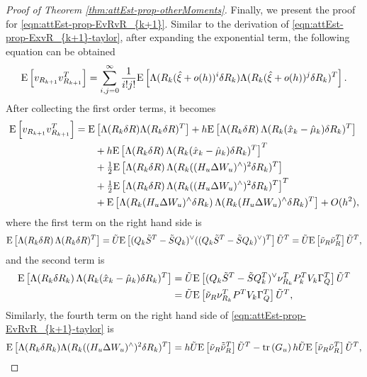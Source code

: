 \begin{proof}[Proof of Theorem \ref{thm:attEst-prop-otherMoments}]
	Finally, we present the proof for \eqref{eqn:attEst-prop-EvRvR_{k+1}}.
	Similar to the derivation of \eqref{eqn:attEst-prop-ExvR_{k+1}-taylor}, after expanding the exponential term, the following equation can be obtained
	\begin{align*}   
		\mathrm{E}\left[ v_{R_{k+1}}v^T_{R_{k+1}} \right] = \sum_{i,j=0}^\infty \frac{1}{i! j!} \mathrm{E}\left[ \Lambda( R_k(\hat{\xi}+o(h))^i \delta R_k) \Lambda( R_k(\hat{\xi}+o(h))^j \delta R_k)^T \right].
	\end{align*}
	After collecting the first order terms, it becomes
	\begin{align} \label{eqn:attEst-prop-EvRvR_{k+1}-taylor}
		\expect{v_{R_{k+1}}v^T_{R_{k+1}}} &= \expect{ \Lambda( R_k\delta R )\Lambda( R_k\delta R )^T } + h\expect{\Lambda( R_k\delta R )\, \Lambda( R_k(\hat{x}_k-\hat{\mu}_k)\delta R_k )^T} \nonumber \\
		&\qquad + h\expect{\Lambda( R_k\delta R )\, \Lambda( R_k(\hat{x}_k-\hat{\mu}_k)\delta R_k )^T}^T \nonumber \\
		&\qquad + \tfrac{1}{2}\expect{\Lambda( R_k\delta R )\, \Lambda( R_k((H_u\Delta W_u)^\wedge)^2\delta R_k )^T} \nonumber \\
		&\qquad + \tfrac{1}{2}\expect{\Lambda( R_k\delta R )\, \Lambda( R_k((H_u\Delta W_u)^\wedge)^2\delta R_k )^T}^T \nonumber \\
		&\qquad + \expect{\Lambda( R_k(H_u\Delta W_u)^\wedge\delta R_k )\, \Lambda( R_k(H_u\Delta W_u)^\wedge\delta R_k )^T } + O(h^2), 
	\end{align}
	where the first term on the right hand side is
	\begin{align*}
		\mathrm{E}\left[ \Lambda( R_k\delta R )\, \Lambda( R_k\delta R )^T \right] = \tilde{U} \mathrm{E}\left[ (Q_k\tilde{S}^T-\tilde{S}Q_k)^\vee((Q_k \tilde{S}^T-\tilde{S}Q_k)^\vee)^T \right] \tilde{U}^T = \tilde{U}\mathrm{E}\left[ \tilde{\nu}_R\tilde{\nu}^T_R \right]\tilde{U}^T,
	\end{align*}
	and the second term is 
	\begin{align*}
		\mathrm{E}\left[ \Lambda( R_k\delta R_k )\, \Lambda( R_k(\hat{x}_k-\hat{\mu}_k )\delta R_k )^T \right] &= \tilde{U} \mathrm{E}\left[ (Q_k \tilde{S}^T-\tilde{S}Q_k^T)^\vee \nu^T_{R_k} P_k^T V_k \Gamma_Q^T \right] \tilde{U}^T \\
		&= \tilde{U} \mathrm{E}\left[ \tilde{\nu}_R\nu_{R_k}^T P^T V_k \Gamma_Q^T \right] \tilde{U}^T,
	\end{align*}
	Similarly, the fourth term on the right hand side of \eqref{eqn:attEst-prop-EvRvR_{k+1}-taylor} is
	\begin{align*}
		\expect{\Lambda( R_k\delta R_k ) \Lambda( R_k((H_u\Delta W_u)^\wedge)^2\delta R_k )^T } = h\tilde{U}\expect{\tilde{\nu}_R\tilde{\tilde{\nu}}^T_R}\tilde{U}^T - \tr{G_u}h\tilde{U}\expect{\tilde{\nu}_R\tilde{\nu}_R^T}\tilde{U}^T,

\end{align*}
\end{proof}
